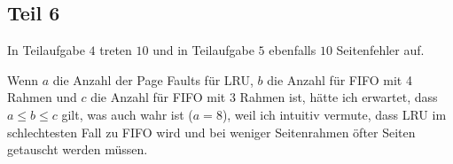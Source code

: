 \documentclass[10pt,a4paper]{article}
\begin{document}
\subsection*{Teil 6}

In Teilaufgabe $4$ treten $10$ und in Teilaufgabe $5$ ebenfalls $10$ Seitenfehler auf.

Wenn $a$ die Anzahl der Page Faults für LRU, $b$ die Anzahl für FIFO mit 4 Rahmen und $c$ die Anzahl für FIFO mit 3 Rahmen ist, hätte ich erwartet, dass $a \le b \le c$ gilt, was auch wahr ist ($a = 8$), weil ich intuitiv vermute, dass LRU im schlechtesten Fall zu FIFO wird und bei weniger Seitenrahmen öfter Seiten getauscht werden müssen.
\end{document}
